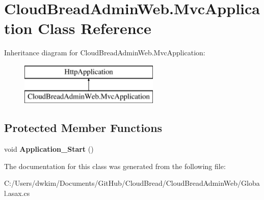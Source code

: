 \hypertarget{a00167}{}\section{Cloud\+Bread\+Admin\+Web.\+Mvc\+Application Class Reference}
\label{a00167}
Inheritance diagram for Cloud\+Bread\+Admin\+Web.\+Mvc\+Application\+:\begin{figure}[H]
\begin{center}
\leavevmode
\includegraphics[height=2.000000cm]{a00167}
\end{center}
\end{figure}
\subsection*{Protected Member Functions}
\begin{DoxyCompactItemize}
\item 
void {\bfseries Application\+\_\+\+Start} ()\hypertarget{a00167_afb0486ff316f2e219b9096853abaa930}{}\label{a00167_afb0486ff316f2e219b9096853abaa930}

\end{DoxyCompactItemize}


The documentation for this class was generated from the following file\+:\begin{DoxyCompactItemize}
\item 
C\+:/\+Users/dwkim/\+Documents/\+Git\+Hub/\+Cloud\+Bread/\+Cloud\+Bread\+Admin\+Web/Global.\+asax.\+cs\end{DoxyCompactItemize}
